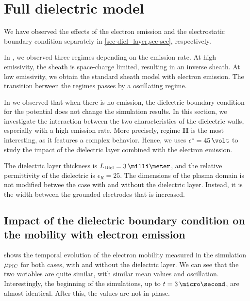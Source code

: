 
\section{Full dielectric model }
  \label{sec-fulldiel}
  
  We have observed the effects of the electron emission and the electrostatic boundary condition separately in \cref{sec-diel_layer,sec-see}, respectively.
  
  
  In , we observed three regimes depending on the emission rate.
  At high emissivity, the sheath is space-charge limited, resulting in an inverse sheath.
  At low emissivity, we obtain the standard sheath model with electron emission.
  The transition between the regimes passes by a oscillating regime.
  
  In  we observed that when there is no emission, the dielectric boundary condition for the potential does not change the simulation results.
  In this section, we investigate the interaction between the two characteristics of the dielectric walls, especially with a high emission rate.
  More precisely, regime {\bf II} is the most interesting, as it features a complex behavior.
  Hence, we uses $\crover=45\,\volt$ to study the impact of the dielectric layer combined with the electron emission.
  
  The dielectric layer thickness is $L_{\rm Diel} = 3\,\milli\meter$, and the relative permittivity of the dielectric is $\epsilon_R=25$.
  The dimensions of the plasma domain is not modified betwee the case with and without the dielectric layer.
  Instead, it is the width between the grounded electrodes that is increased.
  
  \subsection{Impact of the dielectric boundary condition on the mobility with electron emission}
    
     shows the temporal evolution of the electron mobility measured in the simulation $\mu_{\mathrm{PIC}}$ for both cases, with and without the dielectric layer.
    We can see that the two variables are quite similar, with similar mean values and oscillation.
    Interestingly, the beginning of the simulations, up to $t=3\,\micro\second$, are almost identical.
    After this, the values are not in phase.
    
